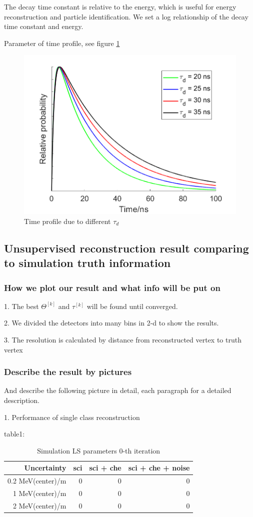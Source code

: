 \documentclass{article}
\begin{document}
\par The decay time constant is relative to the energy, which is useful for energy reconstruction and particle identification. We set a log relationship of the decay time constant and energy. 
\par Parameter of time profile, see figure \ref{fig:3}\\

	\begin{figure}[h]
	\centering\includegraphics[width=3 in]{time_profile.png}
	\caption{Time profile due to different $\tau_d$}
	\label{fig:3}
	\end{figure}
	
\subsection{Unsupervised reconstruction result comparing to simulation truth information}
\subsubsection{How we plot our result and what info will be put on}
\par 1. The best $\Theta^{[k]}$ and $\tau^{[k]}$ will be found until converged. 
\par 2. We divided the detectors into many bins in 2-d to show the results.
\par 3. The resolution is calculated by distance from reconstructed vertex to truth vertex \\ 

\subsubsection{Describe the result by pictures}
And describe the following picture in detail, each paragraph for a detailed description.
\par 1. Performance of single class reconstruction
\par table1:
	\begin{table}[htbp]
		\centering
		\caption{Simulation LS parameters 0-th iteration}
		\label{tab:4}	
		\begin{tabular}{|r|*{3}{r|}}
		\hline
		Uncertainty & sci & sci + che & sci + che + noise\\
		\hline
		0.2 MeV(center)/m & 0 & 0 & 0 \\
		1 MeV(center)/m & 0 & 0 & 0 \\
		2 MeV(center)/m & 0 & 0 & 0 \\
		\hline
		\end{tabular}
	\end{table}
	
\end{document}
